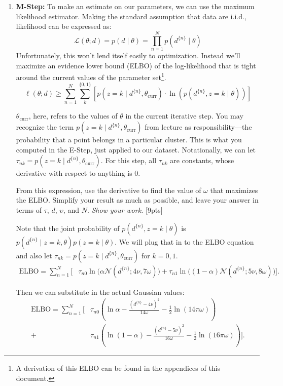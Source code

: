 \begin{enumerate}[label=\alph*.]
    \item \textbf{M-Step:} To make an estimate on our parameters, we can use the maximum likelihood estimator. Making the standard assumption that data are i.i.d., likelihood can be expressed as:
    $$\mathcal{L}(\theta; d) = p(d\mid \theta) = \prod_{n=1}^N p(d^{\{n\}} \mid\theta)$$
    Unfortunately, this won't lend itself easily to optimization. Instead we'll maximize an evidence lower bound (ELBO) of the log-likelihood that is tight around the current values of the parameter set\footnote{A derivation of this ELBO can be found in the appendices of this document.}.
    $$\ell(\theta; d) \geq \sum_{n=1}^N \sum_k^{\{0,1\}} \left[ p(z=k\mid d^{\{n\}}, \theta_{\text{curr}})\cdot \ln\left(p(d^{\{n\}}, z=k \mid \theta)\right) \right]$$
    \begin{hintbox}
        $\theta_{\text{curr}}$, here, refers to the values of $\theta$ in the current iterative step. You may recognize the term $p(z=k\mid d^{\{n\}}, \theta_{\text{curr}})$ from lecture as responsibility—the probability that a point belongs in a particular cluster. This is what you computed in the E-Step, just applied to our dataset. Notationally, we can let $\tau_{nk} = p(z=k\mid d^{\{n\}}, \theta_{\text{curr}})$. For this step, all $\tau_{nk}$ are constants, whose derivative with respect to anything is 0.
    \end{hintbox}

    From this expression, use the derivative to find the value of $\omega$ that maximizes the ELBO. Simplify your result as much as possible, and leave your answer in terms of $\tau$, $d$, $\upsilon$, and $N$. \emph{Show your work.} [9pts]

    Note that the joint probability of \(p(d^{\{n\}},z=k\mid\theta)\) is \(p(d^{\{n\}}\mid z=k,\theta)p(z=k\mid\theta)\). We will plug that in to the ELBO equation and also let $\tau_{nk} = p(z=k\mid d^{\{n\}}, \theta_{\text{curr}})$ for $k=0, 1$.
    \[
    \begin{aligned}
    \text{ELBO}=\sum_{n=1}^N \Big[&
    \tau_{n0}\ln\big(\alpha\mathcal N(d^{\{n\}};4\nu,7\omega)\big)
    +\tau_{n1}\ln\big((1-\alpha)\mathcal N(d^{\{n\}};5\nu,8\omega)\big)\Big].
    \end{aligned}
    \]
    
    Then we can substitute in the actual Gaussian values:
    \[
    \begin{aligned}
    \text{ELBO}=\sum_{n=1}^N \Bigg[&
    \tau_{n0}\left(\ln\alpha-\frac{(d^{\{n\}}-4\nu)^2}{14\omega}
    -\frac12\ln(14\pi\omega)\right)\\
    +&\tau_{n1}\left(\ln(1-\alpha)-\frac{(d^{\{n\}}-5\nu)^2}{16\omega}
    -\frac12\ln(16\pi\omega)\right)\Bigg].
    \end{aligned}
    \]
    

\end{enumerate}

